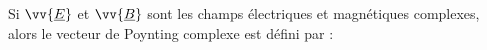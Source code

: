 ﻿\documentclass[a4paper]{article}
\begin{document}
\pagestyle{fancy}
\fancyhf{}
\setlength{\headheight}{15pt}

\begin{center}
	\large{}
\end{center}


Si \(\vv{\underline{E}}\) et \(\vv{\underline{B}}\) sont les champs électriques et magnétiques complexes, alors le vecteur de Poynting complexe est défini par :
\begin{center}\end{center}
\end{document}
